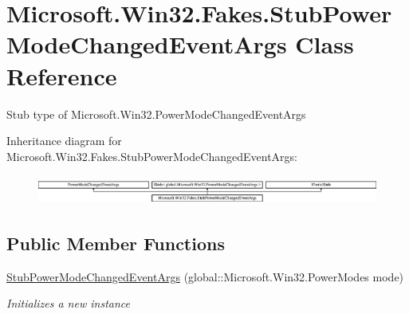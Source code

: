 \hypertarget{class_microsoft_1_1_win32_1_1_fakes_1_1_stub_power_mode_changed_event_args}{\section{Microsoft.\-Win32.\-Fakes.\-Stub\-Power\-Mode\-Changed\-Event\-Args Class Reference}
\label{class_microsoft_1_1_win32_1_1_fakes_1_1_stub_power_mode_changed_event_args}
}


Stub type of Microsoft.\-Win32.\-Power\-Mode\-Changed\-Event\-Args 


Inheritance diagram for Microsoft.\-Win32.\-Fakes.\-Stub\-Power\-Mode\-Changed\-Event\-Args\-:\begin{figure}[H]
\begin{center}
\leavevmode
\includegraphics[height=0.972222cm]{class_microsoft_1_1_win32_1_1_fakes_1_1_stub_power_mode_changed_event_args}
\end{center}
\end{figure}
\subsection*{Public Member Functions}
\begin{DoxyCompactItemize}
\item 
\hyperlink{class_microsoft_1_1_win32_1_1_fakes_1_1_stub_power_mode_changed_event_args_a126424d90de76fcef8fa53aa9702fae1}{Stub\-Power\-Mode\-Changed\-Event\-Args} (global\-::\-Microsoft.\-Win32.\-Power\-Modes mode)
\begin{DoxyCompactList}\small\item\em Initializes a new instance\end{DoxyCompactList}\end{DoxyCompactItemize}
